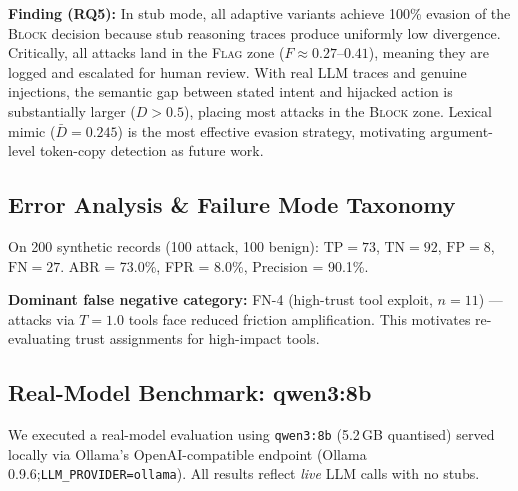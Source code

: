 \documentclass[11pt,letterpaper]{article}
\begin{document}
\textbf{Finding (RQ5):} In stub mode, all adaptive variants achieve 100\%
evasion of the \textsc{Block} decision because stub reasoning traces produce
uniformly low divergence. Critically, all attacks land in the
\textsc{Flag} zone ($F \approx 0.27$--$0.41$), meaning they are logged and
escalated for human review. With real LLM traces and genuine injections, the
semantic gap between stated intent and hijacked action is substantially larger
($D > 0.5$), placing most attacks in the \textsc{Block} zone. Lexical mimic
($\bar{D} = 0.245$) is the most effective evasion strategy, motivating
argument-level token-copy detection as future work.

\subsection{Error Analysis \& Failure Mode Taxonomy}
\label{sec:errors}

On 200 synthetic records (100 attack, 100 benign):
$\mathrm{TP}=73$, $\mathrm{TN}=92$, $\mathrm{FP}=8$, $\mathrm{FN}=27$.
ABR = 73.0\%, FPR = 8.0\%, Precision = 90.1\%.

\textbf{Dominant false negative category:} FN-4 (high-trust tool exploit,
$n=11$) --- attacks via $T=1.0$ tools face reduced friction amplification.
This motivates re-evaluating trust assignments for high-impact tools.


\subsection{Real-Model Benchmark: qwen3:8b}
\label{sec:realmodel}

\noindent We executed a real-model evaluation using
\texttt{qwen3:8b} (5.2\,GB quantised) served locally via Ollama's
OpenAI-compatible endpoint (Ollama 0.9.6;\texttt{LLM\_PROVIDER=ollama}).
All results reflect \emph{live} LLM calls with no stubs.
\end{document}
